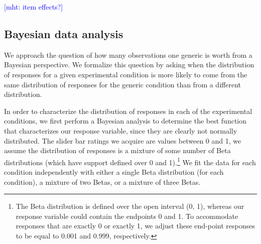 \documentclass[10pt,letterpaper]{article}
\newcommand{\mht}[1]{\textcolor{Blue}{[mht: #1]}}
\begin{document}
\mht{item effects?}


\subsection{Bayesian data analysis}

We approach the question of how many observations one generic is worth from a Bayesian perspective. 
We formalize this question by asking when the distribution of responses for a given experimental condition is more likely to come from the same distribution of responses for the generic condition than from a different distribution. 

In order to characterize the distribution of responses in each of the experimental conditions, we first perform a Bayesian analysis to determine the best function that characterizes our response variable, since they are clearly not normally distributed.
The slider bar ratings we acquire are values between 0 and 1, we assume the distribution of responses is a mixture of some number of Beta distributions (which have support defined over 0 and 1).\footnote{The Beta distribution is defined over the open interval (0, 1), whereas our response variable could contain the endpoints 0 and 1. To accommodate responses that are exactly 0 or exactly 1, we adjust these end-point responses to be equal to 0.001 and 0.999, respectively.}
We fit the data for each condition independently with either a single Beta distribution (for each condition), a mixture of two Betas, or a mixture of three Betas. 
\end{document}
